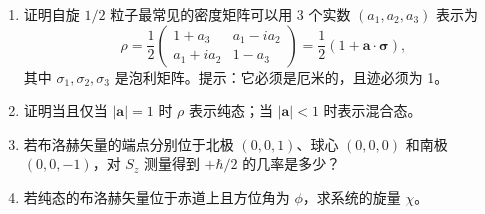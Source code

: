\begin{question}
\begin{enumerate}
\item 证明自旋 $1/2$ 粒子最常见的密度矩阵可以用 3 个实数 $(a_1,a_2,a_3)$ 表示为
\[
\rho=\frac12\begin{pmatrix}1+a_3&a_1-ia_2\\a_1+ia_2&1-a_3\end{pmatrix}=\frac12(1+\mathbf a\cdot\boldsymbol\sigma),
\]
其中 $\sigma_1,\sigma_2,\sigma_3$ 是泡利矩阵。提示：它必须是厄米的，且迹必须为 1。
\item 证明当且仅当 $|\mathbf a|=1$ 时 $\rho$ 表示纯态；当 $|\mathbf a|<1$ 时表示混合态。
\item 若布洛赫矢量的端点分别位于北极 $(0,0,1)$、球心 $(0,0,0)$ 和南极 $(0,0,-1)$，对 $S_z$ 测量得到 $+\hbar/2$ 的几率是多少？
\item 若纯态的布洛赫矢量位于赤道上且方位角为 $\phi$，求系统的旋量 $\chi$。
\end{enumerate}
\end{question}
